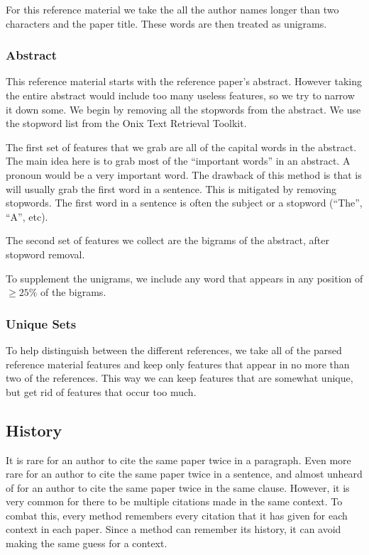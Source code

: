 \documentclass[10pt, conference, compsocconf]{IEEEtran}
\begin{document}
For this reference material we take the all the author names longer than two characters and the paper title.
These words are then treated as unigrams.

\subsubsection{Abstract}
This reference material starts with the reference paper's abstract. However taking the entire abstract would include too many
useless features, so we try to narrow it down some. We begin by removing all the stopwords from the abstract. We use
the stopword list from the Onix Text Retrieval Toolkit\cite{stopwords}.

The first set of features that we grab are all of the capital words in the abstract. The main idea here is to grab
most of the ``important words'' in an abstract. A pronoun would be a very important word. The drawback of this method is that
is will usually grab the first word in a sentence. This is mitigated by removing stopwords. The first word in a sentence
is often the subject or a stopword (``The'', ``A'', etc).

The second set of features we collect are the bigrams of the abstract, after stopword removal.

To supplement the unigrams, we include any word that appears in any position of $\geq25\%$ of the bigrams.

\subsubsection{Unique Sets}
To help distinguish between the different references, we take all of the parsed reference material features and
keep only features that appear in no more than two of the references. This way we can keep features that are somewhat
unique, but get rid of features that occur too much.

\subsection{History}
It is rare for an author to cite the same paper twice in a paragraph. Even more rare for
an author to cite the same paper twice in a sentence, and almost unheard of for an author to cite the
same paper twice in the same clause. However, it is very common for there to be multiple citations
made in the same context. To combat this, every method remembers every citation that it has given
for each context in each paper. Since a method can remember its history, it can avoid making the
same guess for a context.
\end{document}
